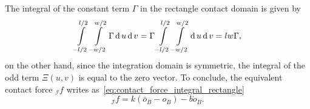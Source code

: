 The integral of the constant term $\Gamma$ in the rectangle contact domain is given by
\begin{equation}
   \int\limits_{-l/2}^{l/2} \int\limits_{-w/2}^{w/2}  \Gamma \operatorname{d} u \operatorname{d} v = \Gamma \int\limits_{-l/2}^{l/2} \int\limits_{-w/2}^{w/2}   \operatorname{d} u \operatorname{d} v  =  l w \Gamma,
\end{equation}
on the other hand, since the integration domain is symmetric, the integral of the odd term $\Xi(u,v)$ is equal to the zero vector.
To conclude, the equivalent contact force ${}_\mathcal{I} f$ writes as~\eqref{eq:contact_force_integral_rectangle}
\begin{equation}
    {}_\mathcal{I} f = k (\bar{o}_B - o_B) - b\dot{o}_B.
\end{equation}
\par

